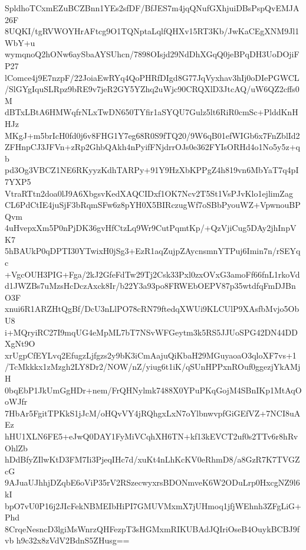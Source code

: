 SpldhoTCxmEZuBCZBnn1YEs2sfDF/BfJES7m4jqQNufGXhjuiDBsPspQvEMJA26F
8UQKI/tgRVWOYHrAFtcg9O1TQNptaLqlfQHXv15RT3Kb/JwKaCEgXNM9Jl1WbY+u
wymqnoQ2hONw6aySbaAYSUhcn/7898OIsjd29NdDhXGqQ0jeBPqDH3UoDOjiFP27
lComce4j9E7nzpF/22JoiaEwRYq4QoPHRfDIgd8G77JqVyxhav3hIj0oDIePGWCL
/SlGYgIquSLRpz9bRE9v7jeR2GY5YZhq2uWjc90CRQXlD3JtcAQ/uW6QZ2cffs0M
dBTxLBtA6HMWqfrNLxTwDN650TYfir1aSYQU7Gulz5lt6RiR0cmSc+PlddKnHHJz
MKgJ+m5brIcH0fd0j6v8FHG1Y7eg68R0S9fTQ20/9W6qB01efWIGb6x7FnZblId2
ZFHnpCJ3JFVn+zRp2GhbQAkh4nPyifFNjdrrOJs0e362FYIsORHd4o1No5y5z+qb
pd3Og3VBCZ1NE6RKyyzKdhTARPy+91Y9HzXbKPPgZ4h819vn6MbYaT7q4pI7YXP5
VtraRTtn2doa0lJ9A6XbgsvKedXAQCIDxf1OK7Ncv2T5St1VsPJvKlo1ejlimZag
CL6PdCtIE4juSjF3bRqmSFw6z8pYH0X5BIRczugWf7oSBbPyouWZ+VpwnouBPQvm
4uHvepxXm5P0nPjDK36gvHfCtzLq9Wr9CutPqmtKp/+QzVjiCug5DAy2jhInpVK7
5hBAUkP0qDPTI30YTwixH0jSg3+EzR1aqZujpZAycnsmnYTPuj6Imin7n/rSEYqc
+VgcOUH3PIG+Fga/2kJ2GfeFdTw29Tj2Csk33Pxl0zxOVxG3amoFf66fnL1rkoVd
d1JWZBs7uMzsHcDczAxck8Ir/b22Y3a93po8FRWEbOEPV87p35wtdfqFmDJBnO3F
xnui6R1ARZHtQgBf/DcU3nLlPO78cRN79ftedqXWUi9KLCUlP9XAsfbMvjo5ObU8
i+MQryiRC27I9mqUG4eMpML7bT7NSvWFGeytm3k5RS5JJUoSPG42DN44DDXgNt9O
xrUgpCfEYLvq2EfugzLjfgzs2y9bK3iCmAajuQiKbaH29MGuyaoaO3qloXF7vs+1
/TcMkkkx1zMzgh2LY8Dr2/NOW/nZ/yiug6t1iK/qSUnHPPxnROuf0ggezjYkAMjH
0bqEbP1JkUmGgHDr+nem/FrQHNylmk7488X0YPuPKqGojM4SBnIKp1MtAqOoWJfr
7HbAr5FgitTPKkS1jJcM/oHQvVY4jRQhgxLxN7oYlbnwvpfGiGEfVZ+7NCI8uAEz
hHU1XLN6FE5+eJwQ0DAY1FyMiVCqhXH6TN+kf13kEVCT2uf0s2TTv6r8hRvOhlZb
hDdBfyZIlwKtD3FM7Ii3PjeqIHc7d/xuKt4nLhKcKV0eRhmD8/a8GzR7K7TVGZcG
9AJuaUJhhjDZqbE6oViP35rV2RSzecwyxrsBDONmveK6W2ODuLrp0HxcgNZ9l6kI
bpO7vU0P16j2JIcFekNBMEIbHiPI7GMUVMxmX7jUHmoq1jfjWEhnh3ZFgLiG+Phd
8CrqeNesncD3lgiMsWnrzQHFezpT3sHGMxmRIKUBAdJQIriOseB4OuykBCBJ9fvb
h9c32x8zVdV2BdnS5ZHusg==

